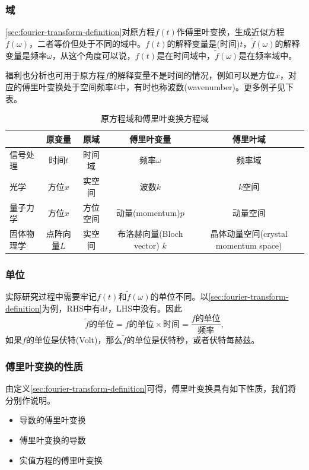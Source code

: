 \subsubsection{域}
\label{sec:fourier-domains}

\eqref{sec:fourier-transform-definition}对原方程$f(t)$作傅里叶变换，生成近似方程$\tilde{f}(\omega)$，二者等价但处于不同的域中。$f(t)$的解释变量是(时间)$t$，$\tilde{f}(\omega)$的解释变量是频率$\omega$，从这个角度可以说，$f(t)$是在时间域中，$\tilde{f}(\omega)$是在频率域中。

福利也分析也可用于原方程$f$的解释变量不是时间的情况，例如可以是方位$x$，对应的傅里叶变换处于空间频率$k$中，有时也称波数(wavenumber)。更多例子见下表。

\begin{table}[htbp]
\caption{原方程域和傅里叶变换方程域}
\begin{tabular}{|l|cccc|}
\hline
& 原变量 & 原域 & 傅里叶变量& 傅里叶域 \\ \hline
信号处理 & 时间$t$ & 时间域 & 频率$\omega$ & 频率域 \\
光学 & 方位$x$ & 实空间 & 波数$k$ & $k$空间 \\
量子力学 & 方位$x$ & 方位空间 & 动量(momentum)$p$ & 动量空间 \\
固体物理学 & 点阵向量$L$ & 实空间 & 布洛赫向量(Bloch vector) $k$ & 晶体动量空间(crystal momentum space)
\\ \hline
\end{tabular}
\label{tab:fourier-domain-definition}
\end{table}

\subsubsection{单位}
实际研究过程中需要牢记$f(t)$和$\tilde{f}(\omega)$的单位不同。以\eqref{sec:fourier-transform-definition}为例，RHS中有$\mathrm{d} t$，LHS中没有。因此
\begin{equation*}
    \tilde{f}\text{的单位} = f\text{的单位} \times \text{时间} = \frac{f\text{的单位}}{\text{频率}},
\end{equation*}
如果$f$的单位是伏特(Volt)，那么$\tilde{f}$的单位是伏特秒，或者伏特每赫兹。

\subsubsection{傅里叶变换的性质}
\label{sec:fourier-properties}
由定义\eqref{sec:fourier-transform-definition}可得，傅里叶变换具有如下性质，我们将分别作说明。
\begin{itemize}
  \item 导数的傅里叶变换
  \item 傅里叶变换的导数
  \item 实值方程的傅里叶变换
\end{itemize}

